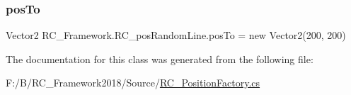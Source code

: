 \mbox{\label{class_r_c___framework_1_1_r_c__pos_random_line_a94be18c12a06b0b082996478b08f36a1}} 
\subsubsection{\texorpdfstring{pos\+To}{posTo}}
{\footnotesize\ttfamily Vector2 R\+C\+\_\+\+Framework.\+R\+C\+\_\+pos\+Random\+Line.\+pos\+To = new Vector2(200, 200)}



The documentation for this class was generated from the following file\+:\begin{DoxyCompactItemize}
\item 
F\+:/\+B/\+R\+C\+\_\+\+Framework2018/\+Source/\mbox{\hyperlink{_r_c___position_factory_8cs}{R\+C\+\_\+\+Position\+Factory.\+cs}}\end{DoxyCompactItemize}
